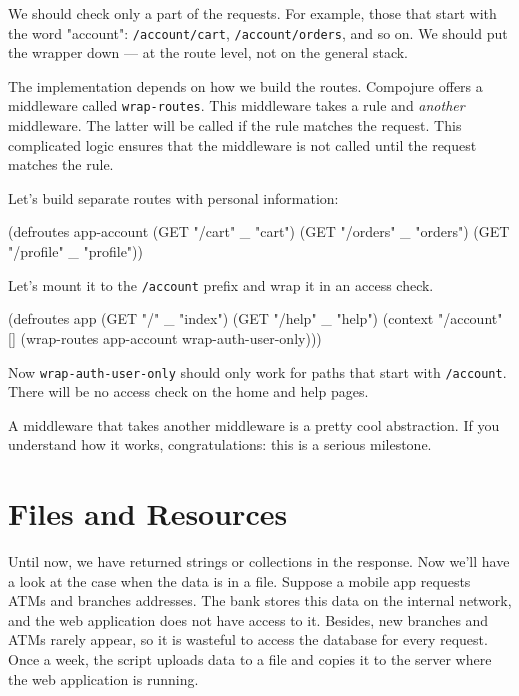 We should check only a part of the requests. For example, those that start with the word "account": \verb|/account/cart|, \verb|/account/orders|, and so on. We should put the wrapper down — at the route level, not on the general stack.

The implementation depends on how we build the routes. Compojure offers a middleware called \verb|wrap-routes|. This middleware takes a rule and \emph{another} middleware. The latter will be called if the rule matches the request. This complicated logic ensures that the middleware is not called until the request matches the rule.

Let's build separate routes with personal information:

\begin{english}
\begin{clojure}
(defroutes app-account
(GET "/cart"    _ "cart")
(GET "/orders"  _ "orders")
(GET "/profile" _ "profile"))
\end{clojure}
\end{english}

\noindent Let's mount it to the \verb|/account| prefix and wrap it in an access check.

\begin{english}
\begin{clojure}
(defroutes app
(GET "/"     _ "index")
(GET "/help" _ "help")
(context "/account" []
(wrap-routes app-account wrap-auth-user-only)))
\end{clojure}
\end{english}


Now \verb|wrap-auth-user-only| should only work for paths that start with \verb|/account|. There will be no access check on the home and help pages.

A middleware that takes another middleware is a pretty cool abstraction. If you understand how it works, congratulations: this is a serious milestone.

\section{Files and Resources}

\label{http-files}

Until now, we have returned strings or collections in the response. Now we'll have a look at the case when the data is in a file. Suppose a mobile app requests ATMs and branches addresses. The bank stores this data on the internal network, and the web application does not have access to it. Besides, new branches and ATMs rarely appear, so it is wasteful to access the database for every request. Once a week, the script uploads data to a file and copies it to the server where
the web application is running.

